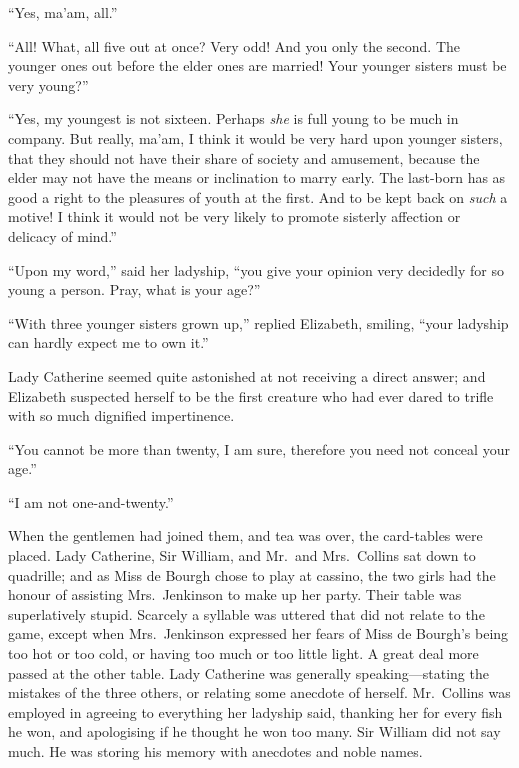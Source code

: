 \documentclass[12pt,english,oneside]{book}
\begin{document}
{}``Yes, ma'am, all.''

{}``All! What, all five out at once? Very odd! And you only the second.
The younger ones out before the elder ones are married! Your younger
sisters must be very young?''\ 

{}``Yes, my youngest is not sixteen. Perhaps \textit{she} is full
young to be much in company. But really, ma'am, I think it would be
very hard upon younger sisters, that they should not have their share
of society and amusement, because the elder may not have the means
or inclination to marry early. The last-born has as good a right to
the pleasures of youth at the first. And to be kept back on \textit{such}
a motive! I think it would not be very likely to promote sisterly
affection or delicacy of mind.''

{}``Upon my word,'' said her ladyship, {}``you give your opinion
very decidedly for so young a person. Pray, what is your age?''\ 

{}``With three younger sisters grown up,'' replied Elizabeth, smiling,
{}``your ladyship can hardly expect me to own it.''

Lady Catherine seemed quite astonished at not receiving a direct answer;
and Elizabeth suspected herself to be the first creature who had ever
dared to trifle with so much dignified impertinence.

{}``You cannot be more than twenty, I am sure, therefore you need
not conceal your age.''

{}``I am not one-and-twenty.''

When the gentlemen had joined them, and tea was over, the card-tables
were placed. Lady Catherine, Sir William, and Mr.\ and Mrs.\ Collins
sat down to quadrille; and as Miss de Bourgh chose to play at cassino,
the two girls had the honour of assisting Mrs.\ Jenkinson to make
up her party. Their table was superlatively stupid. Scarcely a syllable
was uttered that did not relate to the game, except when Mrs.\ Jenkinson
expressed her fears of Miss de Bourgh's being too hot or too cold,
or having too much or too little light. A great deal more passed at
the other table. Lady Catherine was generally speaking\mbox{---}stating
the mistakes of the three others, or relating some anecdote of herself.
Mr.\ Collins was employed in agreeing to everything her ladyship
said, thanking her for every fish he won, and apologising if he thought
he won too many. Sir William did not say much. He was storing his
memory with anecdotes and noble names.
\end{document}
